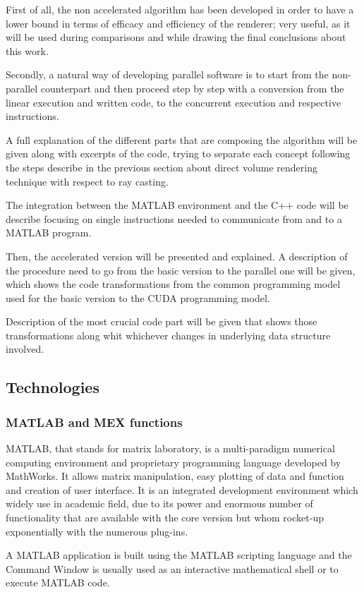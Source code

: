 \documentclass[12pt,a4paper]{extarticle}
\newcommand{\linespace}{\vspace{8pt}}
\begin{document}
First of all, the non accelerated algorithm has been developed in order to have a lower bound in terms of efficacy and efficiency of the renderer; very useful, as it will be used during comparisons and while drawing the final conclusions about this work.

Secondly, a natural way of developing parallel software is to start from the non-parallel counterpart and then proceed step by step with a conversion from the linear execution and written code, to the concurrent execution and respective instructions.

A full explanation of the different parts that are composing the algorithm will be given along with excerpts of the code, trying to separate each concept following the steps describe in the previous section about direct volume rendering technique with respect to ray casting.

The integration between the MATLAB environment and the C++ code will be describe focusing on single instructions needed to communicate from and to a MATLAB program.
\linespace

Then, the accelerated version will be presented and explained. A description of the procedure need to go from the basic version to the parallel one will be given, which shows the code transformations from the common programming model used for the basic version to the CUDA programming model. 

Description of the most crucial code part will be given that shows those transformations along whit whichever changes in underlying data structure involved.

\subsection{Technologies} 
\subsubsection{MATLAB and MEX functions}
MATLAB, that stands for matrix laboratory, is a multi-paradigm numerical computing environment and proprietary programming language developed by MathWorks. It allows matrix manipulation, easy plotting of data and function and creation of user interface.
It is an integrated development environment which widely use in academic field, due to its power and enormous number of functionality that are available with the core version but whom rocket-up exponentially with the numerous plug-ins.

A MATLAB application is built using the MATLAB scripting language and the Command Window is usually used as an interactive mathematical shell or to execute MATLAB code.
\linespace
\end{document}
